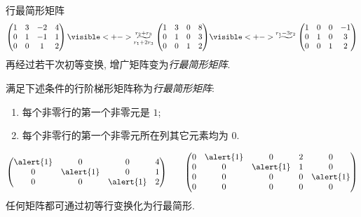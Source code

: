 \begin{frame}{行最简形矩阵}
	\onslide<+->
	\vspace{-\baselineskip}
	\[\begin{pmatrix}
		1&3&-2&4\\
		0&1&-1&1\\
		0&0&1&2
	\end{pmatrix}
	\visible<+->{\wsim{r_2+r_3}{r_1+2r_3}\begin{pmatrix}
		1&3&0&8\\
		0&1&0&3\\
		0&0&1&2
	\end{pmatrix}}
	\visible<+->{\wsim{r_1-3r_2}{}\begin{pmatrix}
		1&0&0&-1\\
		0&1&0&3\\
		0&0&1&2
	\end{pmatrix}}\]
	\onslide<+->
	再经过若干次初等变换, 增广矩阵变为\emph{行最简形矩阵}.
	\onslide<+->
	\begin{definition}
		满足下述条件的行阶梯形矩阵称为\emph{行最简形矩阵}:
		\begin{enumerate}
			\item 每个非零行的第一个非零元是 $1$;
			\item 每个非零行的第一个非零元所在列其它元素均为 $0$.
		\end{enumerate}
	\end{definition}
	\onslide<+->
	\[\begin{pmatrix}
		\alert{1}&0&0&4\\
		0&\alert{1}&0&1\\
		0&0&\alert{1}&2
	\end{pmatrix}
	\qquad\begin{pmatrix}
		0&\alert{1}&0&2&0\\
		0&0&\alert{1}&1&0\\
		0&0&0&0&\alert{1}\\
		0&0&0&0&0
	\end{pmatrix}\]
	\onslide<+->
	任何矩阵都可通过初等行变换化为行最简形.
\end{frame}


